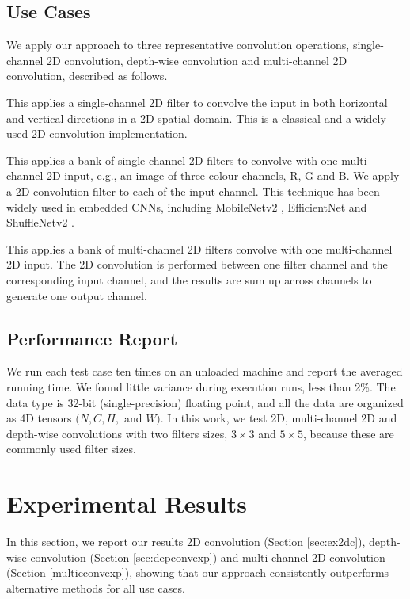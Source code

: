 \subsection{Use Cases}
We apply our approach to three representative convolution operations, single-channel 2D convolution, depth-wise convolution and
multi-channel 2D convolution, described as follows.

 This applies a single-channel 2D filter to convolve the input in both horizontal and vertical
directions in a 2D spatial domain. This is a classical and a widely used 2D convolution implementation.

 This applies a bank of single-channel 2D filters to convolve with one multi-channel 2D input, e.g., an
image of three colour channels, R, G and B. We apply a 2D convolution filter to each of the input channel. This technique has been widely
used in embedded CNNs, including MobileNetv2 \cite{Sandler_2018_CVPR}, EfficientNet \cite{tan2019efficientnet} and ShuffleNetv2
\cite{Ma_2018_ECCV}.

 This applies a bank of multi-channel 2D filters convolve with one multi-channel 2D input. The 2D
convolution is performed between one filter channel and the corresponding input channel, and the results are sum up across channels to
generate one output channel.


\subsection{Performance Report} We run each test case ten times on an unloaded machine and report the averaged running time. We found
little variance during execution runs, less than 2\%.  The data type is 32-bit (single-precision) floating point, and all the data are
organized as 4D tensors $(N,C,H,$ and $W)$. In this work, we test 2D, multi-channel 2D and depth-wise convolutions with two filters sizes,
$3 \times 3$ and $5 \times 5$, because these are commonly used filter sizes.
%

\section{Experimental Results}
\label{exp} In this section, we report our results 2D convolution (Section \ref{sec:ex2dc}), depth-wise convolution (Section
\ref{sec:depconvexp}) and multi-channel 2D convolution (Section \ref {multicconvexp}), showing that our approach consistently outperforms
alternative methods for all use cases.


